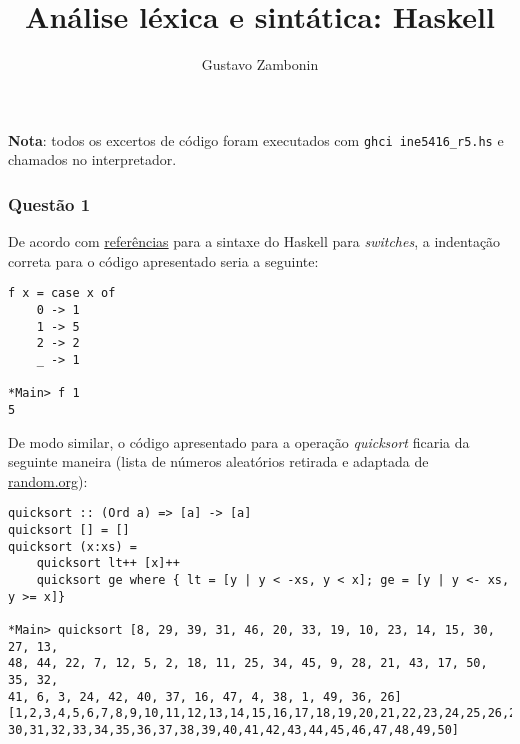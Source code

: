 \documentclass{../sftex/sftex}
\title{Análise léxica e sintática: Haskell}
\author{Gustavo Zambonin}
\begin{document}
\maketitle

\textbf{Nota}: todos os excertos de código foram executados com
\verb!ghci ine5416_r5.hs! e chamados no interpretador.

\subsubsection*{Questão 1}
De acordo com
\href{http://rigaux.org/language-study/syntax-across-languages/CntrFlow.html}
{referências} para a sintaxe do Haskell para \emph{switches}, a indentação
correta para o código apresentado seria a seguinte:
\begin{verbatim}
f x = case x of
    0 -> 1
    1 -> 5
    2 -> 2
    _ -> 1

*Main> f 1
5 \end{verbatim}
De modo similar, o código apresentado para a operação \emph{quicksort}
ficaria da seguinte maneira (lista de números aleatórios retirada e adaptada
de \href{https://random.org/integer-sets/?sets=1&num=50&min=1&max=50&commas=on&order=index&format=plain}
{random.org}):
\begin{verbatim}
quicksort :: (Ord a) => [a] -> [a]
quicksort [] = []
quicksort (x:xs) =
    quicksort lt++ [x]++
    quicksort ge where { lt = [y | y < -xs, y < x]; ge = [y | y <- xs, y >= x]}

*Main> quicksort [8, 29, 39, 31, 46, 20, 33, 19, 10, 23, 14, 15, 30, 27, 13,
48, 44, 22, 7, 12, 5, 2, 18, 11, 25, 34, 45, 9, 28, 21, 43, 17, 50, 35, 32,
41, 6, 3, 24, 42, 40, 37, 16, 47, 4, 38, 1, 49, 36, 26]
[1,2,3,4,5,6,7,8,9,10,11,12,13,14,15,16,17,18,19,20,21,22,23,24,25,26,27,28,29,
30,31,32,33,34,35,36,37,38,39,40,41,42,43,44,45,46,47,48,49,50]
\end{verbatim}
\end{document}
